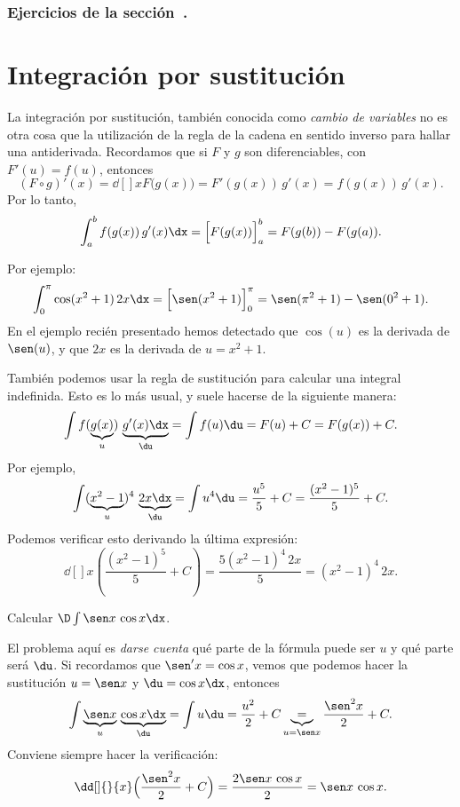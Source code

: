 \subsubsection*{Ejercicios de la sección~.}

\begin{enumerate}
  
\end{enumerate}    


\section{Integración por sustitución}

La integración por sustitución, también conocida como \emph{cambio de variables} no es otra cosa que la utilización de la regla de la cadena en sentido inverso para hallar una antiderivada.
Recordamos que si $F$ y $g$ son diferenciables, con $F'(u)=f(u)$, entonces
\[
(F\circ g)'(x) = \dd[]{}{x} F\big(g(x)) = F'(g(x))\, g'(x) = f(g(x))\, g'(x).
\]
Por lo tanto, 
\[
\int_a^b f(g(x))\, g'(x)\dx = \Big[F(g(x))\Big]_a^b = F(g(b))-F(g(a)).
\]

Por ejemplo:
\[
\int_0^\pi \cos(x^2+1)\, 2x \dx = \Big[\sen(x^2+1)\Big]_0^\pi = 
\sen(\pi^2+1)-\sen(0^2+1).
\]
En el ejemplo recién presentado hemos detectado que $\cos(u)$ es la derivada de $\sen(u)$, y que $2x$ es la derivada de $u=x^2+1$.

También podemos usar la regla de sustitución para calcular una integral indefinida. Esto es lo más usual, y suele hacerse de la siguiente manera:
\[
\int f(\underbrace{g(x)}_u) \, \underbrace{g'(x)\dx}_{\du} = 
\int f(u) \du = F(u)+C = F(g(x))+C.
\]
Por ejemplo, 
\[
\int (\underbrace{x^2-1}_u)^4\, \underbrace{2x\dx}_{\du} = \int u^4 \du 
= \frac{u^5}5 + C
= \frac{(x^2-1)^5}5 + C.
\]
Podemos verificar esto derivando la última expresión:
\[
\dd[]{}{x} \left(\frac{(x^2-1)^5}5 + C\right) =
\frac{5(x^2-1)^4\,2x}5 = (x^2-1)^4\, 2x.
\]

\begin{example}
  Calcular $\D \int \sen x\,\cos x\dx$.

  El problema aquí es \emph{darse cuenta} qué parte de la fórmula puede ser $u$ y qué parte será $\du$. 
  Si recordamos que $\sen'x = \cos x$, vemos que podemos hacer la sustitución $u=\sen x$ y $\du = \cos x\dx$, entonces
  \[
  \int \underbrace{\sen x}_u\,\underbrace{\cos x\dx}_{\du} = \int u \du = \frac{u^2}2 + C 
  \underbrace{=}_{u=\sen x} \frac{\sen^2 x}{2}+ C.
  \]
  Conviene siempre hacer la verificación:
  \[
  \dd[]{}{x}\Big(\frac{\sen^2 x}{2}+ C\Big) = \frac{2 \sen x \, \cos x}2 = \sen x\,\cos x.
  \]
\end{example}

